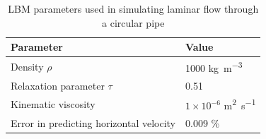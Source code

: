 \begin{table}
\caption{LBM parameters used in simulating laminar flow through a circular pipe}
\label{table:lbm}
\centering
\begin{tabular}{ll}
\toprule
\textbf{Parameter} & \textbf{Value} \\ \midrule
Density $\rho$ & 1000 \si{\kilogram\per\metre\cubed}\\ 
Relaxation parameter $\tau$ & 0.51 \\ 
Kinematic viscosity  & $1 \times 10^{-6}$ \si{\metre\squared\per\second} \\ 
\midrule
Error in predicting horizontal velocity & 0.009 \% \\ \bottomrule
\end{tabular}
\end{table}

